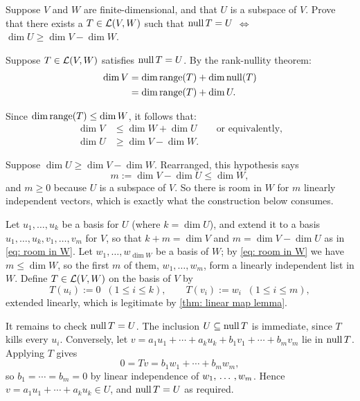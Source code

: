 \begin{xrcs}
  Suppose $V$ and $W$ are finite-dimensional, and that $U$ is a subspace of $V$. Prove that there exists a $T \in \mathcal{L}(V,W)$ such that $\operatorname{null} T = U$ $\iff$ $\dim U \geq \dim V - \dim W$.

  \begin{xprf}
    \Rightarrowdirection Suppose $T \in \mathcal{L}(V,W)$ satisfies $\operatorname{null} T = U$. By the rank-nullity theorem:
    \begin{equation}
      \begin{aligned}
        \dim V &= \dim \operatorname{range}(T) + \dim \operatorname{null}(T) \\
        &= \dim \operatorname{range}(T) + \dim U.
      \end{aligned}
    \end{equation}

    Since $\dim \operatorname{range}(T) \leq \dim W$, it follows that:
    \begin{equation}
      \begin{aligned}
        \dim V &\leq \dim W + \dim U \qquad \text{or equivalently,}  \\
        \dim U &\geq \dim V - \dim W.
      \end{aligned}
    \end{equation}

    \Leftarrowdirection Suppose $\dim U \geq \dim V - \dim W$. Rearranged, this hypothesis says
    \begin{equation}
      \label{eq: room in W}
      m := \dim V - \dim U \leq \dim W,
    \end{equation}
    and $m \geq 0$ because $U$ is a subspace of $V$. So there is room in $W$ for $m$ linearly independent vectors, which is exactly what the construction below consumes.

    Let $u_1, \dots, u_k$ be a basis for $U$ (where $k = \dim U$), and extend it to a basis $u_1, \dots, u_k, v_1, \dots, v_m$ for $V$, so that $k + m = \dim V$ and $m = \dim V - \dim U$ as in \eqref{eq: room in W}. Let $w_1, \dots, w_{\dim W}$ be a basis of $W$; by \eqref{eq: room in W} we have $m \leq \dim W$, so the first $m$ of them, $w_1, \dots, w_m$, form a linearly independent list in $W$. Define $T \in \mathcal{L}(V,W)$ on the basis of $V$ by
    \begin{equation}
      T(u_i) := 0 \;\; (1 \leq i \leq k), \qquad T(v_i) := w_i \;\; (1 \leq i \leq m),
    \end{equation}
    extended linearly, which is legitimate by \ref{thm: linear map lemma}.

    It remains to check $\operatorname{null} T = U$. The inclusion $U \subseteq \operatorname{null} T$ is immediate, since $T$ kills every $u_i$. Conversely, let $v = a_1 u_1 + \cdots + a_k u_k + b_1 v_1 + \cdots + b_m v_m$ lie in $\operatorname{null} T$. Applying $T$ gives
    \begin{equation}
      0 = Tv = b_1 w_1 + \cdots + b_m w_m,
    \end{equation}
    so $b_1 = \cdots = b_m = 0$ by linear independence of $w_1, {\, \ldots \,\,}, w_m$. Hence $v = a_1 u_1 + \cdots + a_k u_k \in U$, and $\operatorname{null} T = U$ as required.
  \end{xprf}
\end{xrcs}


